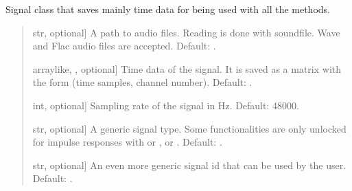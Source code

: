 \documentclass[letterpaper,10pt,english]{sphinxmanual}
\begin{document}
\begin{fulllineitems}
\begin{fulllineitems}
\label{\detokenize{classes:dsptools.classes.signal_class.Signal.__init__}}
\pysigstartsignatures
{}
\pysigstopsignatures
\sphinxAtStartPar
Signal class that saves mainly time data for being used with all the
methods.
\begin{quote}\begin{description}
\begin{description}
\sphinxlineitem{\sphinxstylestrong{path}}{[}str, optional{]}
\sphinxAtStartPar
A path to audio files. Reading is done with soundfile. Wave and
Flac audio files are accepted.
Default: .

\sphinxlineitem{\sphinxstylestrong{time\_data}}{[}array\sphinxhyphen{}like, , optional{]}
\sphinxAtStartPar
Time data of the signal. It is saved as a matrix with the form
(time samples, channel number). Default: .

\sphinxlineitem{\sphinxstylestrong{sampling\_rate\_hz}}{[}int, optional{]}
\sphinxAtStartPar
Sampling rate of the signal in Hz. Default: 48000.

\sphinxlineitem{\sphinxstylestrong{signal\_type}}{[}str, optional{]}
\sphinxAtStartPar
A generic signal type. Some functionalities are only unlocked for
impulse responses with  or ,  or .
Default: .

\sphinxlineitem{\sphinxstylestrong{signal\_id}}{[}str, optional{]}
\sphinxAtStartPar
An even more generic signal id that can be used by the user.
Default: .


\end{description}
\end{description}
\end{quote}
\end{fulllineitems}
\end{fulllineitems}
\end{document}
